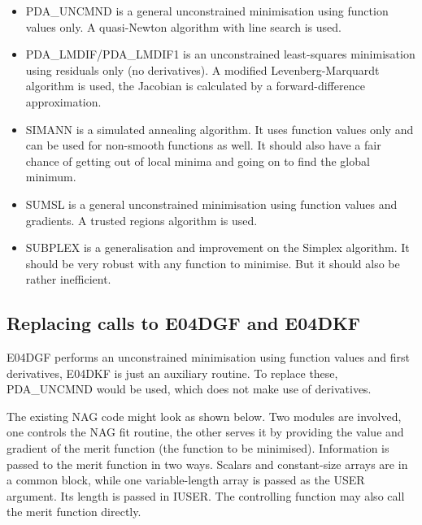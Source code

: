\documentclass[11pt,twoside]{article}
\newcommand{\htmlref}[2]{#1}
\newcommand{\xlabel}[1]{}
\begin{document}
\begin{itemize}
\item 
   PDA\_UNCMND is a general unconstrained minimisation using function values
   only. A quasi-Newton algorithm with line search is used.
\item 
   PDA\_LMDIF/PDA\_LMDIF1 is an unconstrained least-squares minimisation using
   residuals only (no derivatives).
   A modified Levenberg-Marquardt algorithm is used, the Jacobian is
   calculated by a forward-difference approximation.
\item 
   SIMANN is a simulated annealing algorithm. It uses function values
   only and can be used for non-smooth functions as well. It should also
   have a fair chance of getting out of local minima and going on to
   find the global minimum.
\item 
   SUMSL is a general unconstrained minimisation using function values
   and gradients. A trusted regions algorithm is used.
\item 
   SUBPLEX is a generalisation and improvement on the Simplex algorithm.
   It should be very robust with any function to minimise. But it should
   also be rather inefficient.
\end{itemize}


\subsection{\xlabel{replacing_calls_to_e04dgf_and_e04dkf}Replacing calls to E04DGF and E04DKF}

   E04DGF performs an unconstrained minimisation using function
   values and first derivatives, E04DKF is just an auxiliary routine. To
   replace these,
\htmlref{PDA\_UNCMND}{PDA\_UNCMND}
   would be used, which does not make use of
   derivatives.

   The existing NAG code might look as shown below. Two modules are
   involved, one controls the NAG fit routine, the other serves it by
   providing the value and gradient of the merit function (the function
   to be minimised). Information is passed to the merit function in two
   ways. Scalars and constant-size arrays are in a common block, while
   one variable-length array is passed as the USER argument. Its length
   is passed in IUSER. The controlling function may also call the merit
   function directly.
\end{document}
